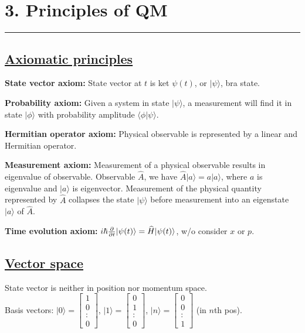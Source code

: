 \scriptsize

\section{3. Principles of QM} \hrule height 0.3pt \thinspace

\subsection{\underline{Axiomatic principles}}

\textbf{State vector axiom:} State vector at $t$ is ket $\psi(t)$, or $|\psi \rangle$, bra state.

\textbf{Probability axiom:} Given a system in state $|\psi \rangle$, a measurement will find it in state $|\phi \rangle$ with probability amplitude $\langle \phi | \psi \rangle$. 

\textbf{Hermitian operator axiom:} Physical observable is represented by a linear and Hermitian operator.

\textbf{Measurement axiom:} Measurement of a physical observable results in eigenvalue of observable. Observable $\widehat{A}$, we have $\widehat{A} | a \rangle = a | a \rangle$, where $a$ is eigenvalue and $|a \rangle$ is eigenvector. Measurement of the physical quantity represented by $\widehat{A}$ collapses the state $|\psi \rangle$ before measurement into an eigenstate $|a \rangle$ of $\widehat{A}$.

\textbf{Time evolution axiom:} $i \hbar \pdv{}{t} | \psi(t) \rangle = \widehat{H} |\psi(t) \rangle$, w/o consider $x$ or $p$.

\subsection{\underline{Vector space}}
State vector is neither in position nor momentum space. \\
Basis vectors:
$|0 \rangle = \begin{bmatrix}
    1 \\
    0 \\
    : \\
    0
    \end{bmatrix}$,
$|1 \rangle = \begin{bmatrix}
    0 \\
    1 \\
    : \\
    0
    \end{bmatrix}$,
$|n \rangle = \begin{bmatrix}
    0 \\
    0 \\
    : \\
    1
\end{bmatrix}$ (in $n$th pos).

